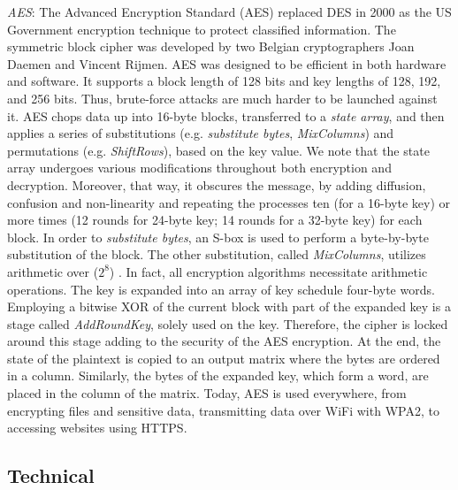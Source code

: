 \textit{AES}: The Advanced Encryption Standard (AES) replaced DES in 2000 as the US Government encryption technique to protect classified information. The symmetric block cipher was developed by two Belgian cryptographers Joan Daemen and Vincent Rijmen. AES was designed to be efficient in both hardware and software. It supports a block length of 128 bits and key lengths of 128, 192, and 256 bits. Thus, brute-force attacks are much harder to be launched against it. AES chops data up into 16-byte blocks, transferred to a \emph{state array}, and then applies a series of substitutions (e.g. \emph{substitute bytes}, \emph{MixColumns}) and permutations (e.g. \emph{ShiftRows}), based on the key value. We note that the state array undergoes various modifications throughout both encryption and decryption. Moreover, that way, it obscures the message, by adding diffusion, confusion and non-linearity and repeating the processes ten (for a 16-byte key) or more times (12 rounds for 24-byte key; 14 rounds for a 32-byte key) for each block. In order to \emph{substitute bytes}, an S-box is used to perform a byte-by-byte substitution of the block. The other substitution, called \emph{MixColumns}, utilizes arithmetic over ($2^{8}$) \cite{stallings2017-a}. In fact, all encryption algorithms necessitate arithmetic operations. The key is expanded into an array of key schedule four-byte words. Employing a bitwise XOR of the current block with part of the expanded key is a stage called \emph{AddRoundKey}, solely used on the key. Therefore, the cipher is locked around this stage adding to the security of the AES encryption.  At the end, the state of the plaintext is copied to an output matrix where the bytes are ordered in a column. Similarly, the bytes of the expanded key, which form a word, are placed in the column of the matrix. Today, AES is used everywhere, from encrypting files and sensitive data, transmitting data over WiFi with WPA2, to accessing websites using HTTPS. 

\subsection{Technical}

